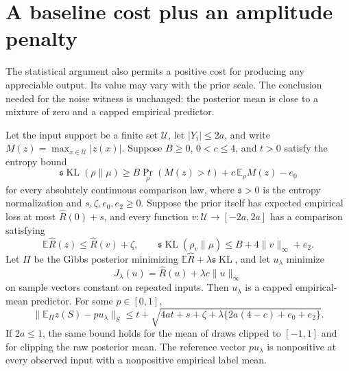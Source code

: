 \section{A baseline cost plus an amplitude penalty}
\label{sec:baseline-prox}
The statistical argument also permits a positive cost for producing any appreciable output. Its value may vary with the prior scale. The conclusion needed for the noise witness is unchanged: the posterior mean is close to a mixture of zero and a capped empirical predictor.

\begin{lemma}
\label{lem:baseline-prox}
Let the input support be a finite set $\mathcal U$, let $|Y_i|\le2a$, and write $M(z)=\max_{x\in\mathcal U}|z(x)|$. Suppose $B\ge0$, $0<c\le4$, and $t>0$ satisfy the entropy bound
\[
 \mathfrak s\operatorname{KL}(\rho\|\mu)
 \ge B\Pr_\rho(M(z)>t)+c\,\mathbb E_\rho M(z)-e_0
\]
for every absolutely continuous comparison law, where $\mathfrak s>0$ is the entropy normalization and $s,\zeta,e_0,e_2\ge0$. Suppose the prior itself has expected empirical loss at most $\widehat R(0)+s$, and every function $v:\mathcal U\to[-2a,2a]$ has a comparison satisfying
\[
 \mathbb E\widehat R(z)\le\widehat R(v)+\zeta,
 \qquad \mathfrak s\operatorname{KL}(\rho_v\|\mu)
        \le B+4\|v\|_\infty+e_2.
\]
Let $\Pi$ be the Gibbs posterior minimizing
$\mathbb E\widehat R+\lambda\mathfrak s\operatorname{KL}$, and let $u_\lambda$ minimize
\[
 J_\lambda(u)=\widehat R(u)+\lambda c\|u\|_\infty
\]
on sample vectors constant on repeated inputs. Then $u_\lambda$ is a capped empirical-mean predictor. For some $p\in[0,1]$,
\[
 \|\mathbb E_\Pi z(S)-p u_\lambda\|_S
 \le t+\sqrt{4at+s+\zeta+
          \lambda\{2a(4-c)+e_0+e_2\}}.
\]
If $2a\le1$, the same bound holds for the mean of draws clipped to $[-1,1]$ and for clipping the raw posterior mean. The reference vector $p u_\lambda$ is nonpositive at every observed input with a nonpositive empirical label mean.
\end{lemma}
